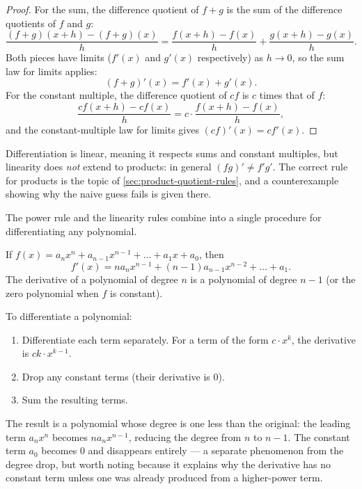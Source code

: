 \begin{proof}
For the sum, the difference quotient of \(f + g\) is the sum of the difference quotients of \(f\) and \(g\):
\[
\frac{(f + g)(x + h) - (f + g)(x)}{h}
= \frac{f(x + h) - f(x)}{h} + \frac{g(x + h) - g(x)}{h}.
\]
Both pieces have limits (\(f'(x)\) and \(g'(x)\) respectively) as \(h \to 0\), so the sum law for limits applies:
\[
(f + g)'(x) = f'(x) + g'(x).
\]
For the constant multiple, the difference quotient of \(c f\) is \(c\) times that of \(f\):
\[
\frac{c f(x + h) - c f(x)}{h}
= c \cdot \frac{f(x + h) - f(x)}{h},
\]
and the constant-multiple law for limits gives \((c f)'(x) = c f'(x)\).
\end{proof}

\begin{caution}
Differentiation is linear, meaning it respects sums and constant multiples, but linearity does \emph{not} extend to products: in general \((f g)' \neq f' g'\). The correct rule for products is the topic of \cref{sec:product-quotient-rules}, and a counterexample showing why the naive guess fails is given there.
\end{caution}

The power rule and the linearity rules combine into a single procedure for differentiating any polynomial.

\begin{corollary}\label{cor:polynomial-derivative}
If \(f(x) = a_{n} x^{n} + a_{n - 1} x^{n - 1} + \dots + a_{1} x + a_{0}\), then
\[
f'(x) = n a_{n} x^{n - 1} + (n - 1) a_{n - 1} x^{n - 2} + \dots + a_{1}.
\]
The derivative of a polynomial of degree \(n\) is a polynomial of degree \(n - 1\) (or the zero polynomial when \(f\) is constant).
\end{corollary}

\begin{strategy}
To differentiate a polynomial:
\begin{enumerate}
    \item Differentiate each term separately. For a term of the form \(c \cdot x^{k}\), the derivative is \(c k \cdot x^{k - 1}\).
    \item Drop any constant terms (their derivative is \(0\)).
    \item Sum the resulting terms.
\end{enumerate}
The result is a polynomial whose degree is one less than the original: the leading term \(a_{n} x^{n}\) becomes \(n a_{n} x^{n - 1}\), reducing the degree from \(n\) to \(n - 1\). The constant term \(a_{0}\) becomes \(0\) and disappears entirely --- a separate phenomenon from the degree drop, but worth noting because it explains why the derivative has no constant term unless one was already produced from a higher-power term.
\end{strategy}

